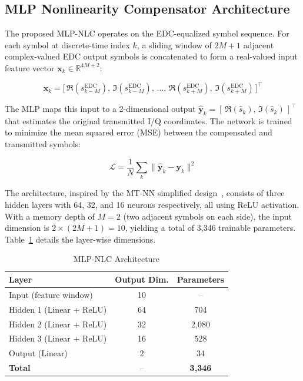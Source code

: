 \documentclass[conference]{IEEEtran}
\begin{document}
\subsection{MLP Nonlinearity Compensator Architecture}

The proposed MLP-NLC operates on the EDC-equalized symbol sequence. For each symbol at discrete-time index $k$, a sliding window of $2M + 1$ adjacent complex-valued EDC output symbols is concatenated to form a real-valued input feature vector $\mathbf{x}_k \in \mathbb{R}^{4M + 2}$:

\begin{equation}
\mathbf{x}_k = \bigl[\,\Re(s_{k-M}^{\text{EDC}}),\,\Im(s_{k-M}^{\text{EDC}}),\,\dots,\,
\Re(s_{k+M}^{\text{EDC}}),\,\Im(s_{k+M}^{\text{EDC}})\,\bigr]^\top
\label{eq:features}
\end{equation}

The MLP maps this input to a 2-dimensional output $\hat{\mathbf{y}}_k = [\,\Re(\hat{s}_k),\,\Im(\hat{s}_k)\,]^\top$ that estimates the original transmitted I/Q coordinates. The network is trained to minimize the mean squared error (MSE) between the compensated and transmitted symbols:

\begin{equation}
\mathcal{L} = \frac{1}{N}\sum_{k} \bigl\| \hat{\mathbf{y}}_k - \mathbf{y}_k \bigr\|^2
\label{eq:loss}
\end{equation}

The architecture, inspired by the MT-NN simplified design~\cite{mtnn2025}, consists of three hidden layers with 64, 32, and 16 neurons respectively, all using ReLU activation. With a memory depth of $M = 2$ (two adjacent symbols on each side), the input dimension is $2 \times (2M + 1) = 10$, yielding a total of 3,346 trainable parameters. Table~\ref{tab:arch} details the layer-wise dimensions.

\begin{table}[h]
\centering
\caption{MLP-NLC Architecture}
\label{tab:arch}
\begin{tabular}{@{}lcc@{}}
\toprule
\textbf{Layer} & \textbf{Output Dim.} & \textbf{Parameters} \\
\midrule
Input (feature window)  & 10      & -- \\
Hidden 1 (Linear + ReLU) & 64     & 704 \\
Hidden 2 (Linear + ReLU) & 32     & 2,080 \\
Hidden 3 (Linear + ReLU) & 16     & 528 \\
Output (Linear)          & 2      & 34 \\
\midrule
\textbf{Total}           & --     & \textbf{3,346} \\
\bottomrule
\end{tabular}
\end{table}
\end{document}
